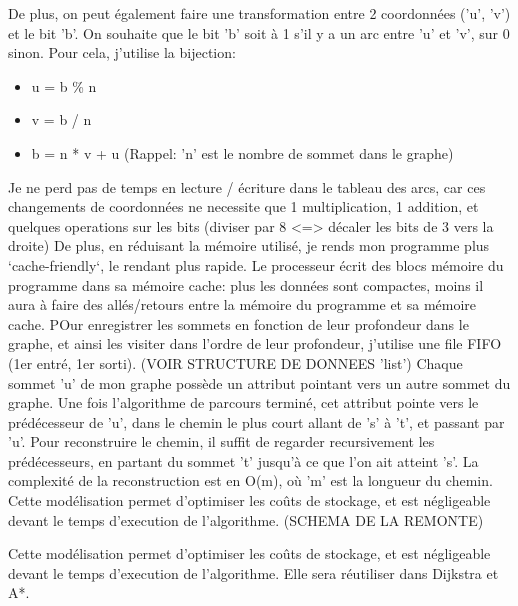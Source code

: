 \documentclass[a4paper,10pt]{article}
\begin{document}
    
    De plus, on peut également faire une transformation entre 2 coordonnées ('u', 'v') et le bit 'b'.
    On souhaite que le bit 'b' soit à 1 s'il y a un arc entre 'u' et 'v', sur 0 sinon.
    Pour cela, j'utilise la bijection:
    \begin{itemize}[label=-]
      \item u = b \% n
      \item v = b / n
      \item b = n * v + u (Rappel: 'n' est le nombre de sommet dans le graphe)
    \end{itemize}
    Je ne perd pas de temps en lecture / écriture dans le tableau des arcs, car ces changements
    de coordonnées ne necessite que 1 multiplication, 1 addition, et quelques operations sur les bits (diviser par 8 <=> décaler
    les bits de 3 vers la droite)\newline\newline
    De plus, en réduisant la mémoire utilisé, je rends mon programme plus `cache-friendly`, le rendant plus rapide.
    Le processeur écrit des blocs mémoire du programme dans sa mémoire cache: plus les données sont compactes,
    moins il aura à faire des allés/retours entre la mémoire du programme et sa mémoire cache.\newline\newline
    POur enregistrer les sommets en fonction de leur profondeur dans le graphe, et ainsi les visiter dans l'ordre de leur profondeur,
    j'utilise une file FIFO (1er entré, 1er sorti).\newline
    (VOIR STRUCTURE DE DONNEES 'list')\newline\newline
    Chaque sommet 'u' de mon graphe possède un attribut pointant vers un autre sommet du graphe.
    Une fois l'algorithme de parcours terminé, cet attribut pointe vers le prédécesseur de 'u',
    dans le chemin le plus court allant de 's' à 't', et passant par 'u'.
    Pour reconstruire le chemin, il suffit de regarder recursivement les prédécesseurs, en partant du sommet 't' jusqu'à ce que l'on ait atteint 's'.
    La complexité de la reconstruction est en O(m), où 'm' est la longueur du chemin. Cette modélisation permet d'optimiser les coûts de stockage,
    et est négligeable devant le temps d'execution de l'algorithme.
    (SCHEMA DE LA REMONTE)\newline\newline
    
    Cette modélisation permet d'optimiser les coûts de stockage, et est négligeable devant le temps
    d'execution de l'algorithme. Elle sera réutiliser dans Dijkstra et A*.
    
\end{document}
